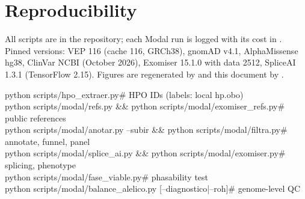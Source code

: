 \documentclass[10pt]{article}
\begin{document}
\section{Reproducibility}
All scripts are in the repository; each Modal run is logged with its cost in .
Pinned versions: VEP 116 (cache 116, GRCh38), gnomAD v4.1, AlphaMissense hg38, ClinVar NCBI (October 2026), Exomiser
15.1.0 with data 2512, SpliceAI 1.3.1 (TensorFlow 2.15). Figures are regenerated by 
and this document by .
\begin{keybox}
\ttfamily\footnotesize
python scripts/hpo\_extraer.py\hfill\# HPO IDs (labels: local hp.obo)\\
python scripts/modal/refs.py \&\& python scripts/modal/exomiser\_refs.py\hfill\# public references\\
python scripts/modal/anotar.py --subir \&\& python scripts/modal/filtra.py\hfill\# annotate, funnel, panel\\
python scripts/modal/splice\_ai.py \&\& python scripts/modal/exomiser.py\hfill\# splicing, phenotype\\
python scripts/modal/fase\_viable.py\hfill\# phasability test\\
python scripts/modal/balance\_alelico.py [--diagnostico|--roh]\hfill\# genome-level QC
\end{keybox}
\end{document}
